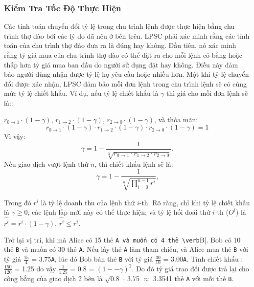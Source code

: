 \documentclass{article}
\begin{document}
\begin{multicols}{2}
\subsubsection{Kiểm Tra Tốc Độ Thực Hiện\label{sec:fill_rate_check}}


Các tính toán chuyển đổi tỷ lệ trong chu trình lệnh được thực hiện bằng chu trình thợ đào bởi các lý do đã nêu ở bên trên. LPSC phải xác minh rằng các tính toán của chu trình thợ đào đưa ra là đúng hay không. Đầu tiên, nó xác minh rằng tỷ giá mua của chu trình thợ đào có thể đặt ra cho mỗi lệnh có bằng hoặc thấp hơn tỷ giá mua ban đầu do người sử dụng đặt hay không. Điều này đảm bảo người dùng nhận được tỷ lệ họ yêu cầu hoặc nhiều hơn. Một khi tỷ lệ chuyển đổi được xác nhận, LPSC đảm bảo mỗi đơn lệnh trong chu trình lệnh sẽ có cùng mức tỷ lệ chiết khấu. Ví dụ, nếu tỷ lệ chiết khấu là $\gamma$ thì giá cho mỗi đơn lệnh sẽ là::

$r_{0\rightarrow 1} \cdot (1-\gamma)$, $r_{1\rightarrow 2} \cdot (1-\gamma)$, $r_{2 \rightarrow 0} \cdot (1-\gamma)$, và thỏa mãn: 
\begin{equation}
r_{0\rightarrow 1} \cdot (1-\gamma)\cdot r_{1\rightarrow 2} \cdot (1-\gamma) \cdot r_{2 \rightarrow 0} \cdot (1-\gamma) = 1
\end{equation}
Vì vậy: 
\begin{equation}
\gamma = 1- \frac{1}{\sqrt[3]{r_{0\rightarrow 1} \cdot r_{1\rightarrow 2} \cdot r_{2\rightarrow 0}}}\text{.}
\end{equation}
Nếu giao dịch vượt lệnh thứ $n$, thì chiết khấu lệnh sẽ là: 
\begin{equation}
\gamma = 1- \frac{1}{\sqrt[n]{\prod_{i=0}^{n-1} r^i}} \text{,}
\end{equation}

Trong đó $r^i$ là tỷ lệ doanh thu của lệnh thứ $i$-th. Rõ ràng, chỉ khi tỷ lệ chiết khấu là $\gamma \ge 0$,  các lệnh lắp mới này có thể thực hiện;  và tỷ lệ hối đoái thứ $i$-th ($O^i$) là $\hat{r^i} = r^i \cdot (1-\gamma)$, $\hat{r^i}\le r^i$.

Trở lại vị trí, khi mà Alice có 15 thẻ \verb|A và muốn có 4 thẻ \verb|B|. Bob có 10 thẻ \verb|B| và muốn có 30 thẻ \verb|A|. Nếu lấy thẻ \verb|A| làm tham chiếu, và Alice mua thẻ \verb|B| với tỷ giá $\frac{15}{4}$ = 3.75\verb|A|, lúc đó Bob bán thẻ \verb|B| với tỷ giá  $\frac{30}{10}$ = 3.00\verb|A|. Tính chiết khấu : $\frac{150}{120}$ = 1.25 do vậy $\frac{1}{1.25}$ = 0.8 = $(1 −- \gamma)^2$. Do đó tỷ giá trao đổi được trả lại cho công bằng của giao dịch 2 bên là $\sqrt{0.8}$ $\cdot$ 3.75 $\approx$ 3.3541 thẻ \verb|A| với mỗi thẻ \verb|B|.


\end{multicols}
\end{document}
